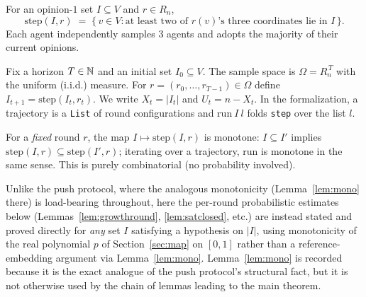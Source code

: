 \begin{definition}\label{def:step}
  \leanok
  For an opinion-$1$ set $I \subseteq V$ and $r \in R_n$,
  \[
    \mathrm{step}(I,r) \;=\; \{\, v \in V : \text{at least two of } r(v)\text{'s three
    coordinates lie in } I \,\}.
  \]
  Each agent independently samples $3$ agents and adopts the majority of
  their current opinions.
\end{definition}

\begin{definition}[Process]\label{def:process}
  \leanok
  Fix a horizon $T \in \mathbb{N}$ and an initial set $I_0 \subseteq V$. The sample
  space is $\Omega = R_n^{\,T}$ with the uniform (i.i.d.) measure. For
  $r = (r_0,\dots,r_{T-1}) \in \Omega$ define $I_{t+1} =
  \mathrm{step}(I_t, r_t)$. We write $X_t = |I_t|$ and $U_t = n - X_t$. In
  the formalization, a trajectory is a \texttt{List} of round configurations
  and $\mathrm{run}\ I\ l$ folds \texttt{step} over the list $l$.
\end{definition}

\begin{lemma}\label{lem:mono}
  \leanok
  For a \emph{fixed} round $r$, the map $I \mapsto \mathrm{step}(I,r)$ is
  monotone: $I \subseteq I'$ implies $\mathrm{step}(I,r) \subseteq
  \mathrm{step}(I',r)$; iterating over a trajectory, $\mathrm{run}$ is
  monotone in the same sense. This is purely combinatorial (no probability
  involved).
\end{lemma}

\begin{remark}
  Unlike the push protocol, where the analogous monotonicity
  (Lemma~\ref{lem:mono} there) is load-bearing throughout, here the
  per-round probabilistic estimates below (Lemmas~\ref{lem:growthround},
  \ref{lem:satclosed}, etc.) are instead stated and proved directly for
  \emph{any} set $I$ satisfying a hypothesis on $|I|$, using monotonicity of
  the real polynomial $p$ of Section~\ref{sec:map} on $[0,1]$ rather than a
  reference-embedding argument via Lemma~\ref{lem:mono}. Lemma~\ref{lem:mono}
  is recorded because it is the exact analogue of the push protocol's
  structural fact, but it is not otherwise used by the chain of lemmas
  leading to the main theorem.
\end{remark}

